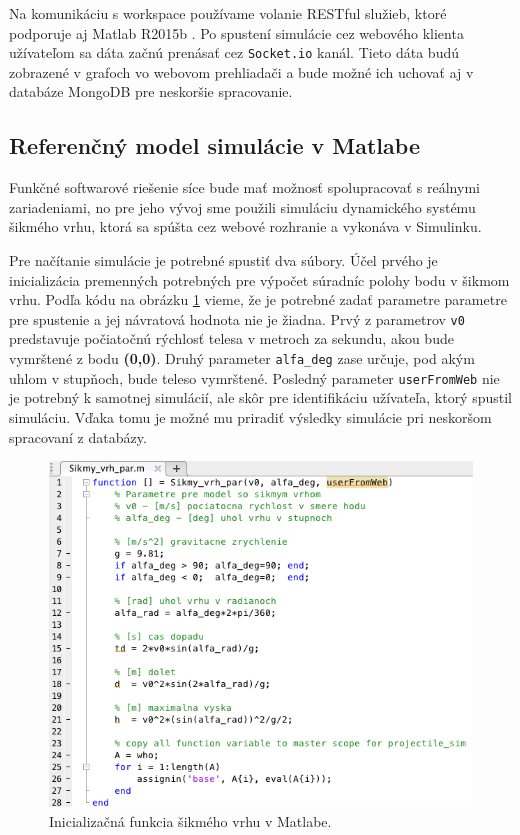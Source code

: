 Na komunikáciu s workspace používame volanie RESTful služieb, ktoré podporuje aj Matlab R2015b \cite{matlab-restful}. Po spustení simulácie cez webového klienta užívateľom sa dáta začnú prenásať cez \verb|Socket.io| kanál. Tieto dáta budú zobrazené v grafoch vo webovom prehliadači a bude možné ich uchovať aj v databáze MongoDB pre neskoršie spracovanie.

\subsection{Referenčný model simulácie v Matlabe}
Funkčné softwarové riešenie síce bude mať možnosť spolupracovať s reálnymi zariadeniami, no pre jeho vývoj sme použili simuláciu dynamického systému šikmého vrhu, ktorá sa spúšta cez webové rozhranie a vykonáva v Simulinku.

Pre načítanie simulácie je potrebné spustiť dva súbory. Účel prvého je inicializácia premenných potrebných pre výpočet súradníc polohy bodu v šikmom vrhu. Podľa kódu na obrázku \ref{img-matlab-function} vieme, že je potrebné zadať parametre parametre pre spustenie a jej návratová hodnota nie je žiadna. Prvý z parametrov \verb|v0| predstavuje počiatočnú rýchlosť telesa v metroch za sekundu, akou bude vymrštené z bodu \textbf{(0,0)}. Druhý parameter \verb|alfa_deg| zase určuje, pod akým uhlom v stupňoch, bude teleso vymrštené. Posledný parameter \verb|userFromWeb| nie je potrebný k samotnej simulácií, ale skôr pre identifikáciu užívateľa, ktorý spustil simuláciu. Vďaka tomu je možné mu priradiť výsledky simulácie pri neskoršom spracovaní z databázy.

\begin{figure}[H]
  \centering
  \includegraphics[scale=0.7]{img/code/matlab-function.png}
  \caption{Inicializačná funkcia šikmého vrhu v Matlabe.}
  \label{img-matlab-function}
\end{figure}

